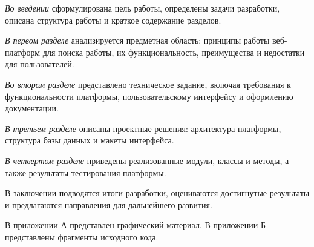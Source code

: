 \emph{Во введении} сформулирована цель работы, определены задачи разработки, описана структура работы и краткое содержание разделов.

\emph{В первом разделе} анализируется предметная область: принципы работы веб-платформ для поиска работы, их функциональность, преимущества и недостатки для пользователей.

\emph{Во втором разделе} представлено техническое задание, включая требования к функциональности платформы, пользовательскому интерфейсу и оформлению документации.

\emph{В третьем разделе} описаны проектные решения: архитектура платформы, структура базы данных и макеты интерфейса.

\emph{В четвертом разделе} приведены реализованные модули, классы и методы, а также результаты тестирования платформы.

В заключении подводятся итоги разработки, оцениваются достигнутые результаты и предлагаются направления для дальнейшего развития.

В приложении А представлен графический материал.
В приложении Б представлены фрагменты исходного кода. 
